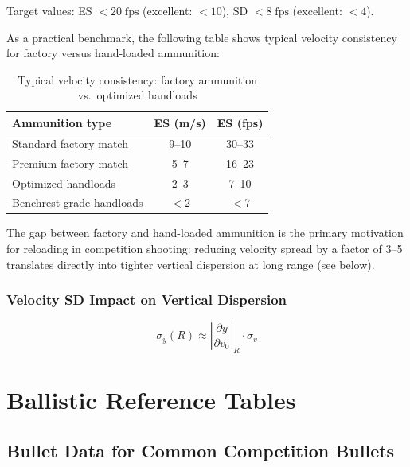 \documentclass[11pt,twoside,openright]{report}
\begin{document}
Target values: ES $< 20\;\text{fps}$ (excellent: $< 10$), SD $< 8\;\text{fps}$ (excellent: $< 4$).

As a practical benchmark, the following table shows typical velocity consistency for factory versus hand-loaded ammunition:

\begin{table}[H]
\centering
\caption{Typical velocity consistency: factory ammunition vs.\ optimized handloads}
\label{tab:velocity_consistency}
\small
\begin{tabular}{@{}lcc@{}}
\toprule
\textbf{Ammunition type} & \textbf{ES (m/s)} & \textbf{ES (fps)} \\
\midrule
Standard factory match    & 9--10  & 30--33 \\
Premium factory match     & 5--7   & 16--23 \\
Optimized handloads       & 2--3   & 7--10 \\
Benchrest-grade handloads & $<$2   & $<$7 \\
\bottomrule
\end{tabular}
\end{table}

The gap between factory and hand-loaded ammunition is the primary motivation for reloading in competition shooting: reducing velocity spread by a factor of 3--5 translates directly into tighter vertical dispersion at long range (see below).

\subsection{Velocity SD Impact on Vertical Dispersion}

\begin{equation}
  \sigma_y(R) \approx \left|\frac{\partial y}{\partial v_0}\right|_{R} \cdot \sigma_v
  \label{eq:vertical_sd}
\end{equation}


\chapter{Ballistic Reference Tables}
\label{ch:tables}

\section{Bullet Data for Common Competition Bullets}
\end{document}
